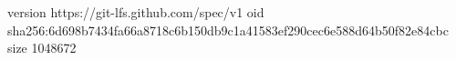 version https://git-lfs.github.com/spec/v1
oid sha256:6d698b7434fa66a8718c6b150db9c1a41583ef290cec6e588d64b50f82e84cbc
size 1048672
